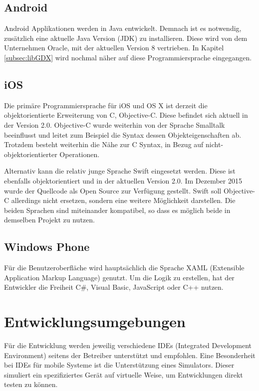 \subsection{Android}
Android Applikationen werden in Java entwickelt. Demnach ist es notwendig, zusätzlich eine aktuelle Java Version (JDK) zu installieren. Diese wird von dem Unternehmen Oracle, mit der aktuellen Version 8  vertrieben. In Kapitel \ref{subsec:libGDX} wird nochmal näher auf diese Programmiersprache eingegangen. 
\citep{java_jdk}

\subsection{iOS}
Die primäre Programmiersprache für iOS und OS X ist derzeit die objektorientierte Erweiterung von C, Objective-C. Diese befindet sich aktuell in der Version 2.0. Objective-C wurde weiterhin von der Sprache Smalltalk beeinflusst und leitet zum Beispiel die Syntax dessen Objekteigenschaften ab. Trotzdem besteht weiterhin die Nähe zur C Syntax, in Bezug auf nicht-objektorientierter Operationen. \citep{objectiveC_about}


Alternativ kann die relativ junge Sprache Swift eingesetzt werden. Diese ist ebenfalls objektorientiert und in der aktuellen Version 2.0. Im Dezember 2015 wurde der Quellcode als Open Source zur Verfügung gestellt. Swift soll Objective-C allerdings nicht ersetzen, sondern eine weitere Möglichkeit darstellen. Die beiden Sprachen sind miteinander kompatibel, so dass es möglich beide in demselben Projekt zu nutzen.
\citep{swift_about}

\subsection{Windows Phone}
Für die Benutzeroberfläche wird hauptsächlich die Sprache XAML (Extensible Application Markup Language) genutzt. Um die Logik zu erstellen, hat der Entwickler die Freiheit C\#, Visual Basic, JavaScript oder C++ nutzen.

\section{Entwicklungsumgebungen}
Für die Entwicklung werden jeweilig verschiedene IDEs (Integrated Development Environment) seitens der Betreiber unterstützt und empfohlen. Eine Besonderheit bei IDEs für mobile Systeme ist die Unterstützung eines Simulators. Dieser simuliert ein spezifiziertes Gerät auf virtuelle Weise, um Entwicklungen direkt testen zu können.

